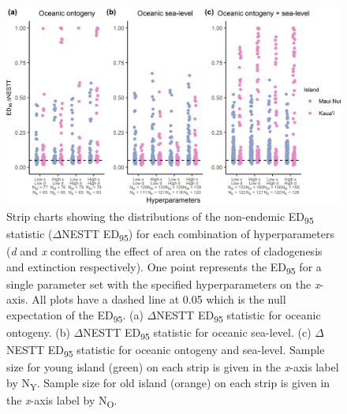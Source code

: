 \begin{figure}
    \centering
    \includegraphics{Hyperparameters_nonendemic.png}
    \caption{Strip charts showing the distributions of the non-endemic ED\textsubscript{95} statistic ($\Delta$NESTT ED\textsubscript{95}) for each combination of hyperparameters (\textit{d} and \textit{x} controlling the effect of area on the rates of cladogenesis and extinction respectively). One point represents the ED\textsubscript{95} for a single parameter set with the specified hyperparameters on the \textit{x}-axis. All plots have a dashed line at 0.05 which is the null expectation of the ED\textsubscript{95}. (a) $\Delta$NESTT ED\textsubscript{95} statistic for oceanic ontogeny. (b) $\Delta$NESTT ED\textsubscript{95} statistic for oceanic sea-level. (c) $\Delta$NESTT ED\textsubscript{95} statistic for oceanic ontogeny and sea-level. Sample size for young island (green) on each strip is given in the \textit{x}-axis label by N\textsubscript{Y}. Sample size for old island (orange) on each strip is given in the \textit{x}-axis label by N\textsubscript{O}.}
    \label{fig:Hyperparameters_nonendemic}
\end{figure}
 
